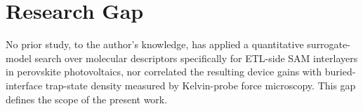 \section{Research Gap}

No prior study, to the author's knowledge, has applied a quantitative
surrogate-model search over molecular descriptors specifically for
ETL-side SAM interlayers in perovskite photovoltaics, nor correlated the
resulting device gains with buried-interface trap-state density measured
by Kelvin-probe force microscopy. This gap defines the scope of the
present work.

